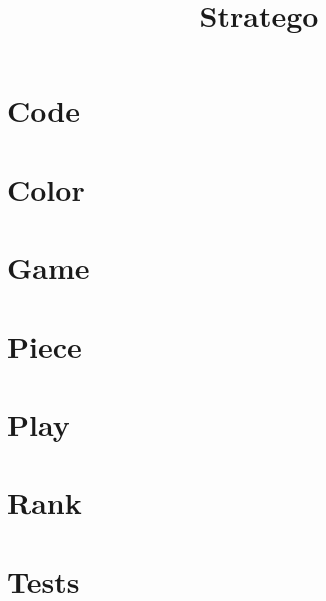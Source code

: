 \documentclass{article}
\begin{document}
\title{Stratego}
\maketitle
\tableofcontents

\section{Code}

\section{Color}

\section{Game}

\section{Piece}

\section{Play}

\section{Rank}

\section{Tests}

\end{document}
